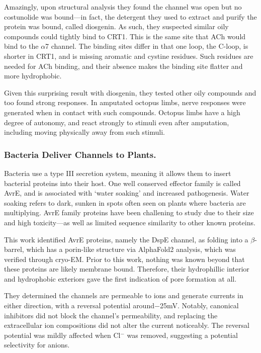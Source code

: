 Amazingly, upon structural analysis they found the channel was open but no costunolide was bound---in fact, the detergent they used to extract and purify the protein was bound, called diosgenin. As such, they suspected similar oily compounds could tightly bind to CRT1. This is the same site that ACh would bind to the $\alpha$7 channel. The binding sites differ in that one loop, the C-loop, is shorter in CRT1, and is missing aromatic and cystine residues. Such residues are needed for ACh binding, and their absence makes the binding site flatter and more hydrophobic.\newline

Given this surprising result with diosgenin, they tested other oily compounds and too found strong responses. In amputated octopus limbs, nerve responses were generated when in contact with such compounds. Octopus limbs have a high degree of autonomy, and react strongly to stimuli even after amputation, including moving physically away from such stimuli.


\subsubsection{Bacteria Deliver Channels to Plants.}
Bacteria use a type III secretion system, meaning it allows them to insert bacterial proteins into their host. One well conserved effector family is called AvrE, and is associated with `water soaking' and increased pathogenesis. Water soaking refers to dark, sunken in spots often seen on plants where bacteria are multiplying. AvrE family proteins have been challening to study due to their size and high toxicity---as well as limited sequence similarity to other known proteins.\newline

This work identified AvrE proteins, namely the DspE channel, as folding into a $\beta$-barrel, which has a porin-like structure via AlphaFold2 analysis, which was verified through cryo-EM. Prior to this work, nothing was known beyond that these proteins are likely membrane bound. Therefore, their hydrophillic interior and hydrophobic exteriors gave the first indication of pore formation at all.\newline

They determined the channels are permeable to ions and generate currents in either direction, with a reversal potential around$-$25mV. Notably, canonical inhibitors did not block the channel's permeability, and replacing the extracellular ion compositions did not alter the current noticeably. The reversal potential was mildly affected when Cl${}^-$ was removed, suggesting a potential selectivity for anions.\newline 

